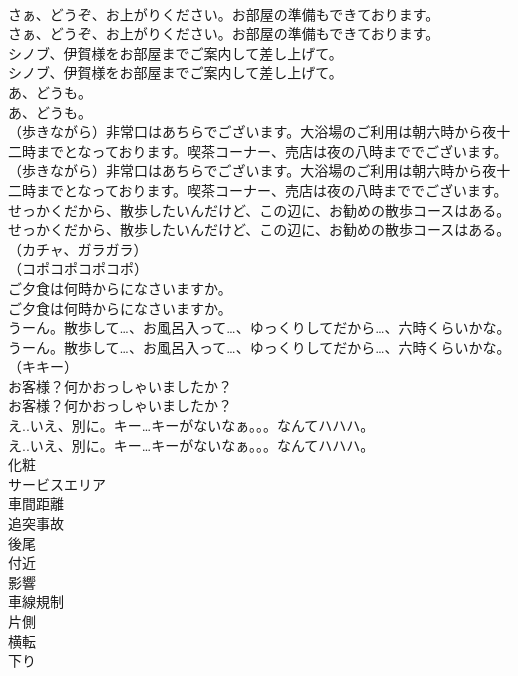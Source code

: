 \documentclass[8pt]{extreport}
\begin{document}
\begin{CJK}{UTF8}{min}
\\	さぁ、どうぞ、お上がりください。お部屋の準備もできております。	
\\	さぁ、どうぞ、お上がりください。お部屋の準備もできております。 
\\	シノブ、伊賀様をお部屋までご案内して差し上げて。	
\\	シノブ、伊賀様をお部屋までご案内して差し上げて。 
\\	あ、どうも。	
\\	あ、どうも。 
\\	（歩きながら）非常口はあちらでございます。大浴場のご利用は朝六時から夜十二時までとなっております。喫茶コーナー、売店は夜の八時まででございます。	
\\	（歩きながら）非常口はあちらでございます。大浴場のご利用は朝六時から夜十二時までとなっております。喫茶コーナー、売店は夜の八時まででございます。 
\\	せっかくだから、散歩したいんだけど、この辺に、お勧めの散歩コースはある。	
\\	せっかくだから、散歩したいんだけど、この辺に、お勧めの散歩コースはある。 
\\	（カチャ、ガラガラ）	
\\	（コポコポコポコポ）	
\\	ご夕食は何時からになさいますか。	
\\	ご夕食は何時からになさいますか。 
\\	うーん。散歩して…、お風呂入って…、ゆっくりしてだから…、六時くらいかな。	
\\	うーん。散歩して…、お風呂入って…、ゆっくりしてだから…、六時くらいかな。 
\\	（キキー）	
\\	お客様？何かおっしゃいましたか？	
\\	お客様？何かおっしゃいましたか？ 
\\	え..いえ、別に。キー…キーがないなぁ。。。なんてハハハ。	
\\	え..いえ、別に。キー…キーがないなぁ。。。なんてハハハ。 
\\	化粧
\\	サービスエリア
\\	車間距離
\\	追突事故
\\	後尾
\\	付近
\\	影響
\\	車線規制
\\	片側
\\	横転
\\	下り

\end{CJK}
\end{document}
